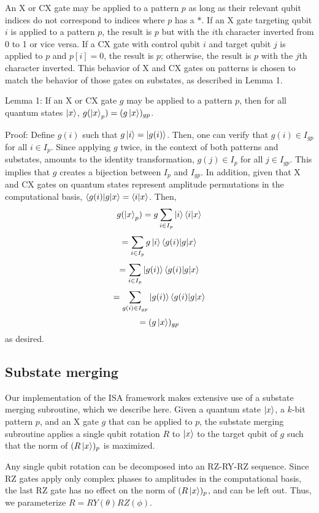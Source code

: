 \documentclass{article}
\begin{document}
An X or CX gate may be applied to a pattern $p$ as long as their relevant qubit
indices do not correspond to indices where $p$ has a $*$. If an X gate
targeting qubit $i$ is applied to a pattern $p$, the result is $p$ but with
the $i$th character inverted from 0 to 1 or vice versa. If a CX gate with
control qubit $i$ and target qubit $j$ is applied to $p$ and $p[i] = 0$, the
result is $p$; otherwise, the result is $p$ with the $j$th character inverted.
This behavior of X and CX gates on patterns is chosen to match the behavior of 
those gates on substates, as described in Lemma 1.

Lemma 1: If an X or CX gate $g$ may be applied to a pattern $p$, then for all 
quantum states $\mathinner{|{x}\rangle}$, $g(\mathinner{|{x}\rangle}_{p}) = (g\mathinner{|{x}\rangle})_{gp}$.

Proof: Define $g(i)$ such that $g\mathinner{|{i}\rangle} = \mathinner{|{g(i)}\rangle}$. Then,
one can verify that $g(i) \in I_{gp}$ for all $i \in I_p$. Since applying $g$
twice, in the context of both patterns and substates, amounts to the identity 
transformation, 
$g(j) \in I_p$ for all $j \in I_{gp}$. This implies that $g$ creates a bijection
between $I_p$ and $I_{gp}$. In addition, given that X and CX gates on quantum
states represent amplitude permutations in the computational basis,
$\mathinner{\langle{g(i)|g|x}\rangle} = \mathinner{\langle{i|x}\rangle}$. Then,
$$g(\mathinner{|{x}\rangle}_p) = g\sum_{i \in I_p}{\mathinner{|{i}\rangle}\mathinner{\langle{i|x}\rangle}}$$
$$ = \sum_{i \in I_p}{g\mathinner{|{i}\rangle}\mathinner{\langle{g(i)|g|x}\rangle}}$$
$$ = \sum_{i \in I_p}{\mathinner{|{g(i)}\rangle}\mathinner{\langle{g(i)|g|x}\rangle}}$$
$$ = \sum_{g(i) \in I_{gp}}{\mathinner{|{g(i)}\rangle}\mathinner{\langle{g(i)|g|x}\rangle}}$$
$$ = (g\mathinner{|{x}\rangle})_{gp}$$
as desired.

\subsection{Substate merging}
Our implementation of the ISA framework makes extensive use of a substate
merging subroutine, which we describe here. Given a quantum state $\mathinner{|{x}\rangle}$,
a $k$-bit pattern $p$, and an X gate $g$ that can be applied to $p$, the 
substate merging subroutine applies a single qubit rotation $R$ to $\mathinner{|{x}\rangle}$ to
the target qubit of $g$ such that the norm of $(R\mathinner{|{x}\rangle})_p$ is maximized.

Any single qubit rotation can be decomposed into an RZ-RY-RZ sequence.
Since RZ gates apply only complex phases to amplitudes in the 
computational basis, the last RZ gate has no effect on the norm of 
$(R\mathinner{|{x}\rangle})_p$, and can be left out. Thus, we parameterize 
$R = RY(\theta)RZ(\phi)$.
\end{document}
